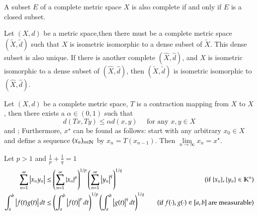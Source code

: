\begin{theorem}\label{thm:1.17}
A subset $E$ of a complete metric space $X$ is also complete if and only if $E$ is a closed subset. 
\end{theorem}

\begin{theorem}\label{thm:1.18}
Let $(X, d)$ be a metric space,then there must be a complete metric space $(\tilde{X}, \tilde{d})$ such that $X$ is isometric isomorphic to a dense subset of $\tilde{X}$. This dense subset is also unique. If there is another complete $(\hat{X}, \hat{d})$, and $X$ is isometric isomorphic to a dense subset of $(\hat{X}, \hat{d})$, then $(\tilde{X}, \tilde{d})$ is isometric isomorphic to $(\hat{X}, \hat{d})$.
\end{theorem}

\begin{theorem}\label{thm:1.19}
Let $(X, d)$ be a complete metric space, $T$ is a contraction mapping from $X$ to $X$, then there exists a $\alpha \in (0, 1)$ such that  
\begin{equation*}
    d(Tx, Ty) \leq \alpha d(x, y) \quad \text{ for any } x, y \in X
\end{equation*}
and ; Furthermore, $x^{\star}$ can be found as follows: start with any arbitrary $x_0 \in X$ and define a sequence $(x_n)_{n \in \mathbb{N}}$ by $x_n = T(x_{n-1})$. Then $\lim\limits_{n \to \infty} x_n = x^{\star}$.
\end{theorem}

\begin{theorem}\label{thm:1.20}
Let $p > 1$ and $\frac{1}{p} + \frac{1}{q} = 1$
\begin{equation}
    \begin{aligned}
        \sum_{n=1}^{\infty}\left|x_n y_n\right| &\leq \left(\sum_{n=1}^{\infty}\left|x_n\right|^p\right)^{1/p} \left(\sum_{n=1}^{\infty}\left|y_n\right|^q\right)^{1/q} \quad &\text{(if $\{x_n\}, \{y_n\} \in \mathbb{K}^n$)}\\
        \int_{a}^{b} \left|f(t) g(t)\right| dt &\leq \left(\int_{a}^{b} \left|f(t)\right|^p dt\right)^{1/p} \left(\int_{a}^{b} \left|g(t)\right|^q dt\right)^{1/q} \quad &\text{(if $f(\cdot),g(\cdot) \in [a, b]$ are measurable)}
    \end{aligned}
\end{equation}
\end{theorem}

